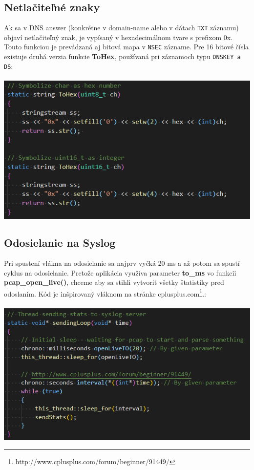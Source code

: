 \documentclass{article}
\begin{document}
        \subsection{Netlačiteľné znaky}
        Ak sa v DNS answer (konkrétne v domain-name alebo v dátach \texttt{TXT} záznamu) objaví netlačiteľný znak, je vypísaný v hexadecimálnom tvare s prefixom 0x. Touto funkciou
        je prevádzaná aj bitová mapa v \texttt{NSEC} zázname. Pre 16 bitové čísla existuje druhá verzia funkcie \textbf{ToHex}, používaná pri záznamoch typu \texttt{DNSKEY a DS}:\\\\
        \includegraphics[scale=0.6]{tohex.png}

        \newpage

        \subsection{Odosielanie na Syslog}
        Pri spustení vlákna na odosielanie sa najprv vyčká 20 ms a až potom sa spustí cyklus na odosielanie. Pretože aplikácia využíva parameter \textbf{to\_ms}
        vo funkcii \textbf{pcap\_open\_live()}, chceme aby sa stihli vytvoriť všetky štatistiky pred odoslaním. Kód je inšpirovaný vláknom na stránke
        cplusplus.com\footnote{http://www.cplusplus.com/forum/beginner/91449/}.:\\\\
        \includegraphics[scale=0.6]{loop.png}
        
\end{document}
